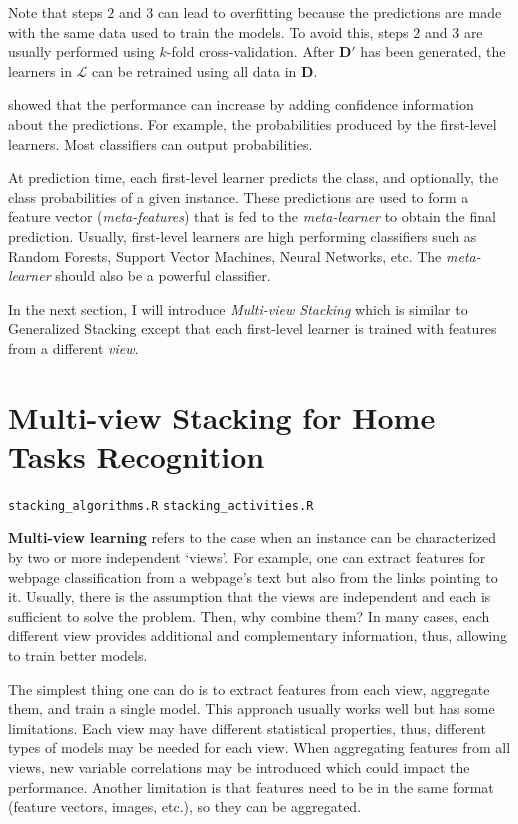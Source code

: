 \documentclass[
  11pt,
]{krantz}
\makeatletter
\newenvironment{kframe}{%
\medskip{}
\setlength{\fboxsep}{.8em}
 \def\at@end@of@kframe{}%
 \ifinner\ifhmode%
  \def\at@end@of@kframe{\end{minipage}}%
  \begin{minipage}{\columnwidth}%
 \fi\fi%
 \def\FrameCommand##1{\hskip\@totalleftmargin \hskip-\fboxsep
 \colorbox{shadecolor}{##1}\hskip-\fboxsep
     \hskip-\linewidth \hskip-\@totalleftmargin \hskip\columnwidth}%
 \MakeFramed {\advance\hsize-\width
   \@totalleftmargin\z@ \linewidth\hsize
   \@setminipage}}%
 {\par\unskip\endMakeFramed%
 \at@end@of@kframe}
\newenvironment{rmdblock}[1]
  {
  \begin{itemize}
  \renewcommand{\labelitemi}{
    \raisebox{-.7\height}[0pt][0pt]{
      {\setkeys{Gin}{width=3em,keepaspectratio}\texttt{[image: images/icons/\#1]}}
    }
  }
  \setlength{\fboxsep}{1em}
  \begin{kframe}
  \item
  }
  {
  \end{kframe}
  \end{itemize}
  }
\newenvironment{rmdfolder}
  {\begin{rmdblock}{folder}}
  {\end{rmdblock}}
\makeatother
\begin{document}
Note that steps \(2\) and \(3\) can lead to overfitting because the predictions are made with the same data used to train the models. To avoid this, steps \(2\) and \(3\) are usually performed using \(k\)-fold cross-validation. After \(\textbf{D}'\) has been generated, the learners in \(\mathscr{L}\) can be retrained using all data in \(\textbf{D}\).

\citet{ting1999} showed that the performance can increase by adding confidence information about the predictions. For example, the probabilities produced by the first-level learners. Most classifiers can output probabilities.

At prediction time, each first-level learner predicts the class, and optionally, the class probabilities of a given instance. These predictions are used to form a feature vector (\emph{meta-features}) that is fed to the \emph{meta-learner} to obtain the final prediction. Usually, first-level learners are high performing classifiers such as Random Forests, Support Vector Machines, Neural Networks, etc. The \emph{meta-learner} should also be a powerful classifier.

In the next section, I will introduce \emph{Multi-view Stacking} which is similar to Generalized Stacking except that each first-level learner is trained with features from a different \emph{view}.

\hypertarget{multiviewhometasks}{%
\section{Multi-view Stacking for Home Tasks Recognition}\label{multiviewhometasks}}

\begin{rmdfolder}
\texttt{stacking\_algorithms.R} \texttt{stacking\_activities.R}
\end{rmdfolder}

\textbf{Multi-view learning} refers to the case when an instance can be characterized by two or more independent `views'. For example, one can extract features for webpage classification from a webpage's text but also from the links pointing to it. Usually, there is the assumption that the views are independent and each is sufficient to solve the problem. Then, why combine them? In many cases, each different view provides additional and complementary information, thus, allowing to train better models.

The simplest thing one can do is to extract features from each view, aggregate them, and train a single model. This approach usually works well but has some limitations. Each view may have different statistical properties, thus, different types of models may be needed for each view. When aggregating features from all views, new variable correlations may be introduced which could impact the performance. Another limitation is that features need to be in the same format (feature vectors, images, etc.), so they can be aggregated.
\end{document}
